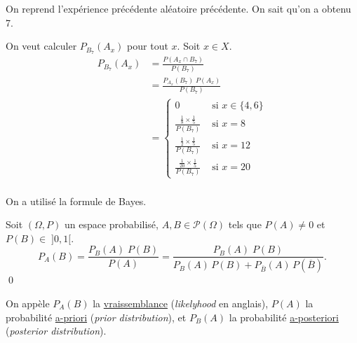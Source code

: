 \begin{exm}
	On reprend l'expérience précédente aléatoire précédente. On sait qu'on a obtenu 7.

	On veut calculer $P_{B_7}(A_x)$ pour tout $x$. Soit $x \in X$.
	\begin{align*}
		P_{B_7}(A_x) &= \frac{P(A_x \cap B_7)}{P(B_7)}\\
		&= \frac{P_{A_x}(B_7)\;P(A_x)}{P(B_7)} \\
		&= \begin{cases}
			 0 &\text{ si } x \in \{ 4, 6\}\\[2mm]
			 \frac{\frac{1}{8} \times \frac{1}{5}}{P(B_7)} & \text{ si } x = 8\\[5mm]
			 \frac{\frac{1}{2} \times \frac{1}{5}}{P(B_7)} &\text{ si } x = 12\\[5mm]
			 \frac{\frac{1}{20}\times \frac{1}{5}}{P(B_7)} &\text{ si } x = 20
		\end{cases} \\
	\end{align*}

	On a utilisé la formule de Bayes.
\end{exm}

\begin{prop}[Bayes]
	Soit $(\Omega, P)$ un espace probabilisé, $A, B \in \mathcal{P}(\Omega)$ tels que $P(A) \neq 0$ et $P(B) \in\;]0,1[$.
	\[
		P_A(B) = \frac{P_B(A)\;P(B)}{P(A)} = \frac{P_B(A)\;P(B)}{P_B(A)\,P(B) + P_{\overline{B}}(A)\,P\left( \overline{B} \right)}.
	\]\qed
\end{prop}

\begin{rmk}
	On appèle $P_A(B)$ la \underline{vraissemblance} ({\it likelyhood} en anglais), $P(A)$ la probabilité \underline{a-priori} ({\it prior distribution}), et $P_B(A)$ la probabilité \underline{a-posteriori} ({\it posterior distribution}).
\end{rmk}

